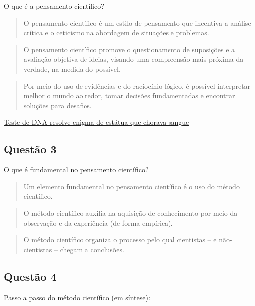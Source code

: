 \documentclass[
]{book}
\begin{document}
O que é a pensamento científico?

\begin{quote}
O pensamento científico é um estilo de pensamento que incentiva a análise crítica e o ceticismo na abordagem de situações e problemas.
\end{quote}

\begin{quote}
O pensamento científico promove o questionamento de suposições e a avaliação objetiva de ideias, visando uma compreensão mais próxima da verdade, na medida do possível.
\end{quote}

\begin{quote}
Por meio do uso de evidências e do raciocínio lógico, é possível interpretar melhor o mundo ao redor, tomar decisões fundamentadas e encontrar soluções para desafios.
\end{quote}

\href{https://www.dw.com/pt-br/teste-de-dna-resolve-enigma-de-virgem-maria-que-chorava-sangue/a-71703557}{Teste de DNA resolve enigma de estátua que chorava sangue}

\subsection{Questão 3}\label{questuxe3o-3}

O que é fundamental no pensamento científico?

\begin{quote}
Um elemento fundamental no pensamento científico é o uso do método científico.
\end{quote}

\begin{quote}
O método científico auxilia na aquisição de conhecimento por meio da observação e da experiência (de forma empírica).
\end{quote}

\begin{quote}
O método científico organiza o processo pelo qual cientistas -- e não-cientistas -- chegam a conclusões.
\end{quote}

\subsection{Questão 4}\label{questuxe3o-4}

Passo a passo do método científico (em síntese):
\end{document}
